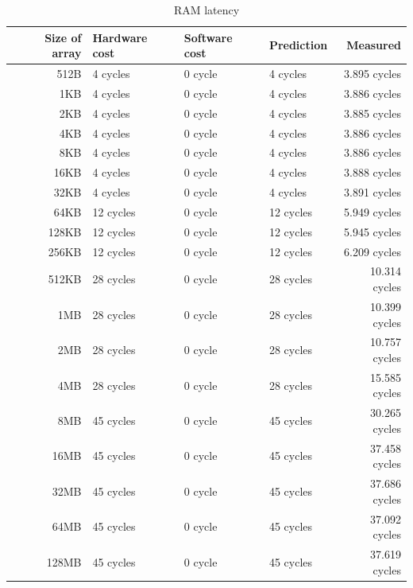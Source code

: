\begin{table}[h]
\begin{center}
\begin{tabular}{| r | l | l | l | r |}
\hline
Size of array 	& Hardware cost 	& Software cost 	& Prediction 	& Measured \\ \hline
512B 			&	4 cycles		&	0 cycle		&	4 cycles	&3.895 cycles	\\ \hline
1KB 			&	4 cycles		&	0 cycle		&	4 cycles	&3.886 cycles		\\ \hline
2KB 			&	4 cycles		&	0 cycle		&	4 cycles	&3.885 cycles		\\ \hline
4KB 			&	4 cycles		&	0 cycle		&	4 cycles	&3.886 cycles		\\ \hline
8KB 			&	4 cycles		&	0 cycle		&	4 cycles	&3.886 cycles		\\ \hline
16KB 			&	4 cycles		&	0 cycle		&	4 cycles	&3.888 cycles		\\ \hline
32KB 			&	4 cycles		&	0 cycle		&	4 cycles	&3.891 cycles		\\ \hline
64KB 			&	12 cycles		&	0 cycle		&	12 cycles	&5.949 cycles		\\ \hline
128KB 		&	12 cycles		&	0 cycle		&	12 cycles	&5.945 cycles		\\ \hline
256KB 		&	12 cycles		&	0 cycle		&	12 cycles	&6.209 cycles		\\ \hline
512KB 		&	28 cycles		&	0 cycle		&	28 cycles	&10.314 cycles		\\ \hline
1MB 			&	28 cycles		&	0 cycle		&	28 cycles	&10.399 cycles		\\ \hline
2MB 			&	28 cycles		&	0 cycle		&	28 cycles	&10.757 cycles		\\ \hline
4MB 			&	28 cycles		&	0 cycle		&	28 cycles	&15.585 cycles		\\ \hline
8MB 			&	45 cycles		&	0 cycle		&	45 cycles	&30.265 cycles		\\ \hline
16MB 			&	45 cycles		&	0 cycle		&	45 cycles	&37.458 cycles		\\ \hline
32MB 			&	45 cycles		&	0 cycle		&	45 cycles	&37.686 cycles		\\ \hline
64MB 			&	45 cycles		&	0 cycle		&	45 cycles	&37.092 cycles		\\ \hline
128MB 		&	45 cycles		&	0 cycle		&	45 cycles	&37.619 cycles		\\ \hline

\hline
\end{tabular}
\end{center}

\caption{RAM latency\label{tab:access-time}}
\end{table}




